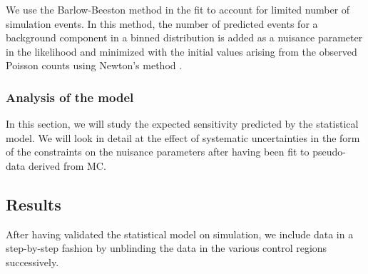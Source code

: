 We use the Barlow-Beeston method in the fit to account for limited number of simulation events. In this method, the number of predicted events for a background component in a binned distribution is added as a nuisance parameter in the likelihood and minimized with the initial values arising from the observed Poisson counts using Newton's method \cite{Barlow:1993dm}. 

\subsubsection{Analysis of the model}
In this section, we will study the expected sensitivity predicted by the statistical model. We will look in detail at the effect of systematic uncertainties in the form of the constraints on the nuisance parameters after having been fit to pseudo-data derived from MC.

\subsection{Results}
After having validated the statistical model on simulation, we include data in a step-by-step fashion by unblinding the data in the various control regions successively.
